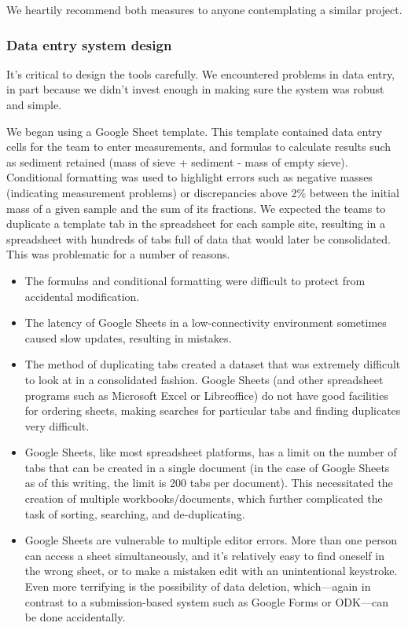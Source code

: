 \documentclass[a4paper,12pt]{article}
\begin{document}
We heartily recommend both measures to anyone contemplating a similar project.

\subsubsection{Data entry system design}
It's critical to design the tools carefully. We encountered problems in data entry, in part because we didn't invest enough in making sure the system was robust and simple.

We began using a Google Sheet template. This template contained data entry cells for the team to enter measurements, and formulas to calculate results such as sediment retained (mass of sieve + sediment - mass of empty sieve). Conditional formatting was used to highlight errors such as negative masses (indicating measurement problems) or discrepancies above 2\% between the initial mass of a given sample and the sum of its fractions. We expected the teams to duplicate a template tab in the spreadsheet for each sample site, resulting in a spreadsheet with hundreds of tabs full of data that would later be consolidated. This was problematic for a number of reasons.

\begin{itemize}
  \item The formulas and conditional formatting were difficult to protect from accidental modification.
  \item The latency of Google Sheets in a low-connectivity environment sometimes caused slow updates, resulting in mistakes.
  \item The method of duplicating tabs created a dataset that was extremely difficult to look at in a consolidated fashion. Google Sheets (and other spreadsheet programs such as Microsoft Excel or Libreoffice) do not have good facilities for ordering sheets, making searches for particular tabs and finding duplicates very difficult.
  \item Google Sheets, like most spreadsheet platforms, has a limit on the number of tabs that can be created in a single document (in the case of Google Sheets as of this writing, the limit is 200 tabs per document). This necessitated the creation of multiple workbooks/documents, which further complicated the task of sorting, searching, and de-duplicating.
  \item Google Sheets are vulnerable to multiple editor errors. More than one person can access a sheet simultaneously, and it's relatively easy to find oneself in the wrong sheet, or to make a mistaken edit with an unintentional keystroke. Even more terrifying is the possibility of data deletion, which---again in contrast to a submission-based system such as Google Forms or ODK---can be done accidentally. 
\end{itemize}
\end{document}
